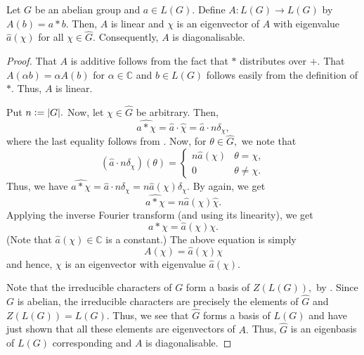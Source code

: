 \documentclass[12pt]{article}	%
\begin{document}
\begin{lem} \label{lem:convolvediagonal}
    Let $G$ be an abelian group and $a \in L(G).$ Define $A : L(G) \to L(G)$ by $A(b) = a * b.$ Then, $A$ is linear and $\chi$ is an eigenvector of $A$ with eigenvalue $\widehat{a}(\chi)$ for all $\chi \in \widehat{G}.$ Consequently, $A$ is diagonalisable.
\end{lem}
\begin{proof} 
    That $A$ is additive follows from the fact that $*$ distributes over $+.$ That $A(\alpha b) = \alpha A(b)$ for $\alpha \in \mathbb{C}$ and $b \in L(G)$ follows easily from the definition of $*.$ Thus, $A$ is linear.

    Put $n \vcentcolon= {\left\lvert G \right\lvert}.$ Now, let $\chi \in \widehat{G}$ be arbitrary. Then,
    \begin{equation*} 
        \widehat{a * \chi} = \widehat{a} \cdot \widehat{\chi} = \widehat{a} \cdot n \delta_\chi,
    \end{equation*}
    where the last equality follows from . Now, for $\theta \in \widehat{G},$ we note that
    \begin{equation*} 
        (\widehat{a} \cdot n \delta_\chi)(\theta) = \begin{cases}
            n\widehat{a}(\chi) & \theta = \chi,\\
            0 & \theta \neq \chi.   
        \end{cases}
    \end{equation*}
    Thus, we have $\widehat{a * \chi} = \widehat{a} \cdot n \delta_\chi = n \widehat{a}(\chi) \delta_\chi.$ By  again, we get
    \begin{equation*} 
        \widehat{a * \chi} = n \widehat{a}(\chi) \widehat{\chi}.
    \end{equation*}
    Applying the inverse Fourier transform (and using its linearity), we get
    \begin{equation*} 
        a * \chi = \widehat{a}(\chi) \chi.
    \end{equation*}
    (Note that $\widehat{a}(\chi) \in \mathbb{C}$ is a constant.) The above equation is simply
    \begin{equation*} 
        A(\chi) = \widehat{a}(\chi)\chi
    \end{equation*}
    and hence, $\chi$ is an eigenvector with eigenvalue $\widehat{a}(\chi).$

    Note that the irreducible characters of $G$ form a basis of $Z(L(G)),$ by . Since $G$ is abelian, the irreducible characters are precisely the elements of $\widehat{G}$ and $Z(L(G)) = L(G).$ Thus, we see that $\widehat{G}$ forms a basis of $L(G)$ and have just shown that all these elements are eigenvectors of $A.$ Thus, $\widehat{G}$ is an eigenbasis of $L(G)$ corresponding and $A$ is diagonalisable.
\end{proof}
\end{document}
